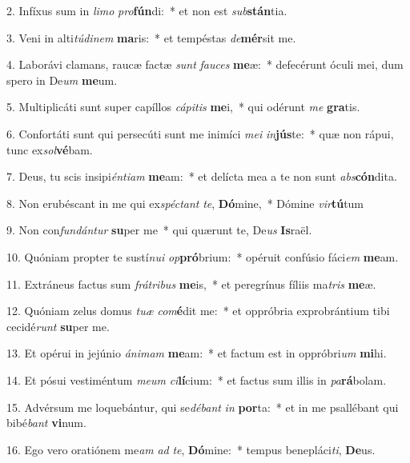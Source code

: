 2. Infíxus sum in \textit{li}\textit{mo} \textit{pro}\textbf{fún}di:~*  et non est \textit{sub}\textbf{stán}tia.\

3. Veni in alti\textit{tú}\textit{di}\textit{nem} \textbf{ma}ris:~*  et tempéstas \textit{de}\textbf{mér}sit me.\

4. Laborávi clamans, raucæ factæ \textit{sunt} \textit{fau}\textit{ces} \textbf{me}æ:~*  defecérunt óculi mei, dum spero in De\textit{um} \textbf{me}um.\

5. Multiplicáti sunt super capíllos \textit{cá}\textit{pi}\textit{tis} \textbf{me}i,~*  qui odérunt \textit{me} \textbf{gra}tis.\

6. Confortáti sunt qui persecúti sunt me inimíci \textit{me}\textit{i} \textit{in}\textbf{jús}te:~*  quæ non rápui, tunc ex\textit{sol}\textbf{vé}bam.\

7. Deus, tu scis insipi\textit{én}\textit{ti}\textit{am} \textbf{me}am:~*  et delícta mea a te non sunt \textit{abs}\textbf{cón}dita.\

8. Non erubéscant in me qui ex\textit{spéc}\textit{tant} \textit{te}, \textbf{Dó}mine,~*  Dómine \textit{vir}\textbf{tú}tum\

9. Non con\textit{fun}\textit{dán}\textit{tur} \textbf{su}per me~*  qui quærunt te, De\textit{us} \textbf{Is}raël.\

10. Quóniam propter te sustí\textit{nu}\textit{i} \textit{op}\textbf{pró}brium:~*  opéruit confúsio fáci\textit{em} \textbf{me}am.\

11. Extráneus factus sum \textit{frá}\textit{tri}\textit{bus} \textbf{me}is,~*  et peregrínus fíliis ma\textit{tris} \textbf{me}æ.\

12. Quóniam zelus domus \textit{tu}\textit{æ} \textit{com}\textbf{é}dit me:~*  et oppróbria exprobrántium tibi cecidé\textit{runt} \textbf{su}per me.\

13. Et opérui in jejúnio \textit{á}\textit{ni}\textit{mam} \textbf{me}am:~*  et factum est in oppróbri\textit{um} \textbf{mi}hi.\

14. Et pósui vestiméntum \textit{me}\textit{um} \textit{ci}\textbf{lí}cium:~*  et factus sum illis in \textit{pa}\textbf{rá}bolam.\

15. Advérsum me loquebántur, qui se\textit{dé}\textit{bant} \textit{in} \textbf{por}ta:~*  et in me psallébant qui bibé\textit{bant} \textbf{vi}num.\

16. Ego vero oratiónem me\textit{am} \textit{ad} \textit{te}, \textbf{Dó}mine:~*  tempus benepláci\textit{ti}, \textbf{De}us.\

